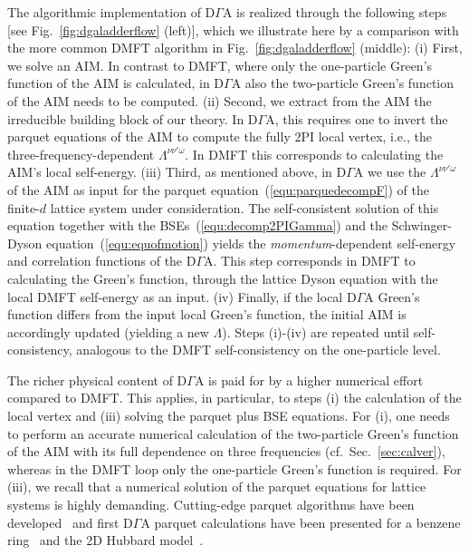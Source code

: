 \documentclass[rmp,aps,reprint,amsmath,amssymb,superscriptaddress,showpacs,nofootinbib]{revtex4-1}
\begin{document}
The algorithmic implementation of D$\Gamma$A is realized through the following steps [see Fig.~\ref{fig:dgaladderflow} (left)], which we illustrate here by a comparison with the more common DMFT algorithm in Fig.~\ref{fig:dgaladderflow}  (middle): (i) First, we solve an AIM. In contrast to DMFT, where only the one-particle Green's function of the AIM is calculated, in D$\Gamma$A also the two-particle Green's function of the AIM needs to be computed. (ii) Second, we extract from the AIM the irreducible building block of our theory. In D$\Gamma$A, this requires one to invert the parquet equations of the AIM  to compute the fully 2PI local vertex, i.e., the three-frequency-dependent $\Lambda^{\nu\nu'\omega}$.   In DMFT this corresponds to calculating the AIM's  local self-energy. (iii) Third, as mentioned above, in D$\Gamma$A we use the $\Lambda^{\nu\nu'\omega}$ of the AIM as input for the parquet equation~(\ref{equ:parquedecompF}) of the finite-$d$ lattice system under consideration. The self-consistent solution of this equation together with the BSEs~(\ref{equ:decomp2PIGamma}) and the Schwinger-Dyson equation~(\ref{equ:equofmotion}) yields  the {\sl momentum}-dependent self-energy and correlation functions of the D$\Gamma$A. This step corresponds in DMFT to calculating the  Green's function, through the lattice Dyson equation with the local DMFT self-energy as an input. (iv) Finally, if the local D$\Gamma$A Green's function differs from the input local Green's function, the initial AIM is accordingly updated (yielding a new $\Lambda$). Steps (i)-(iv) are repeated until self-consistency, analogous to the DMFT self-consistency on the one-particle level.            


The richer physical content of D$\Gamma$A is paid for by a higher numerical effort compared to DMFT. This applies, in particular, to steps (i) the calculation of the local vertex and (iii) solving the parquet plus BSE equations. For (i), one needs to perform an accurate numerical calculation of the two-particle Green's function of the AIM with its full dependence on three frequencies (cf.\ Sec.~\ref{sec:calver}), whereas in the DMFT loop only the one-particle Green's function is required. For (iii), we recall that a numerical solution of the parquet equations for lattice systems is highly demanding. Cutting-edge parquet algorithms have been developed~\cite{Yang2009,Tam2013,Li2016} and first  D$\Gamma$A  parquet calculations have been presented for a benzene ring~\cite{Valli2015} and the 2D Hubbard model~\cite{Li2016}.
 
\end{document}
